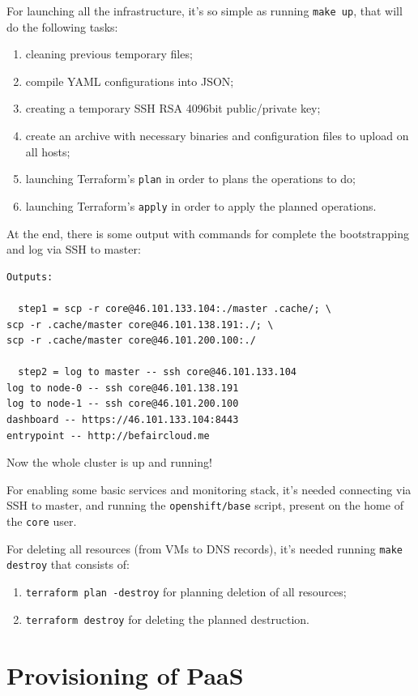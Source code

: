 For launching all the infrastructure, it's so simple as running \texttt{make up}, that will do the following tasks:
\begin{enumerate}
\item cleaning previous temporary files;
\item compile YAML configurations into JSON;
\item creating a temporary SSH RSA 4096bit public/private key;
\item create an archive with necessary binaries and configuration files to upload on all hosts;
\item launching Terraform's \texttt{plan} in order to plans the operations to do;
\item launching Terraform's \texttt{apply} in order to apply the planned operations.
\end{enumerate}

At the end, there is some output with commands for complete the bootstrapping and log via SSH to master:

\begin{verbatim}
Outputs:

  step1 = scp -r core@46.101.133.104:./master .cache/; \
scp -r .cache/master core@46.101.138.191:./; \
scp -r .cache/master core@46.101.200.100:./

  step2 = log to master -- ssh core@46.101.133.104
log to node-0 -- ssh core@46.101.138.191
log to node-1 -- ssh core@46.101.200.100
dashboard -- https://46.101.133.104:8443
entrypoint -- http://befaircloud.me
\end{verbatim}

Now the whole cluster is up and running!

For enabling some basic services and monitoring stack, it's needed connecting via SSH to master, and running the \texttt{openshift/base} script, present on the home of the \texttt{core} user.

For deleting all resources (from VMs to DNS records), it's needed running \texttt{make destroy} that consists of:
\begin{enumerate}
\item \texttt{terraform plan -destroy} for planning deletion of all resources;
\item \texttt{terraform destroy} for deleting the planned destruction.
\end{enumerate}

\section{Provisioning of PaaS}\label{provisioning-of-paas}

